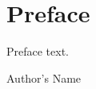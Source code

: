 
\chapter*{Preface}
Preface text.

\begin{flushright}
Author's Name\\
\end{flushright}

\vfill

\eject 
